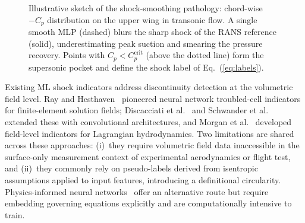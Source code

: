 \documentclass{WCCM-ECCOMAS_2026_Full_Paper}
\begin{document}
\begin{figure}[ht]
\centering
{}
\caption{Illustrative sketch of the shock-smoothing pathology:
  chord-wise $-C_p$ distribution on the upper wing in transonic flow.
  A single smooth MLP (dashed) blurs the sharp shock of the RANS
  reference (solid), underestimating peak suction and smearing the
  pressure recovery.  Points with $C_p < C_p^{\mathrm{crit}}$ (above
  the dotted line) form the supersonic pocket and define the shock
  label of Eq.~(\ref{eq:labels}).}
\label{fig:pathology}
\end{figure}

Existing ML shock indicators address discontinuity detection at the
volumetric field level.  Ray and Hesthaven~\cite{Ray2018,Ray2019}
pioneered neural network troubled-cell indicators for finite-element
solution fields; Discacciati et al.~\cite{Discacciati2020} and
Schwander et al.~\cite{Schwander2021} extended these with
convolutional architectures, and Morgan et al.~\cite{Morgan2020}
developed field-level indicators for Lagrangian hydrodynamics.  Two
limitations are shared across these approaches: (i)~they require
volumetric field data inaccessible in the surface-only measurement
context of experimental aerodynamics or flight test, and (ii)~they
commonly rely on pseudo-labels derived from isentropic assumptions
applied to input features, introducing a definitional circularity.
Physics-informed neural networks~\cite{Raissi2019,Karniadakis2021}
offer an alternative route but require embedding governing equations
explicitly and are computationally intensive to train.
\end{document}
